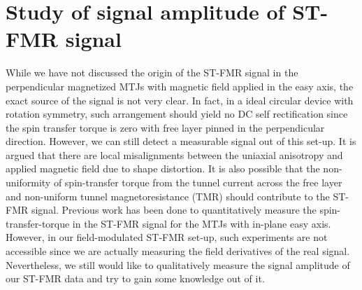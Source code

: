 \clearpage


\section{Study of signal amplitude of ST-FMR signal}

While we have not discussed the origin of the ST-FMR signal in the perpendicular magnetized MTJs with magnetic field applied in the easy axis, the exact source of the signal is not very clear. In fact, in a ideal circular device with rotation symmetry, such arrangement should yield no DC self rectification since the spin transfer torque is zero with free layer pinned in the perpendicular direction. However, we can still detect a measurable signal out of this set-up. It is argued that there are local misalignments between the uniaxial anisotropy and applied magnetic field due to shape distortion\cite{chris}. It is also possible that the non-uniformity of spin-transfer torque from the tunnel current across the free layer and non-uniform  tunnel magnetoresistance (TMR) should contribute to the ST-FMR signal. Previous work has been done to quantitatively measure the spin-transfer-torque in the ST-FMR signal\cite{Sankey2008}\cite{Kubota2007} for the MTJs with in-plane easy axis. However, in our field-modulated ST-FMR set-up, such experiments are not accessible since we are actually measuring the field derivatives of the real signal. Nevertheless, we still would like to qualitatively measure the signal amplitude of our ST-FMR data and try to gain some knowledge out of it.


